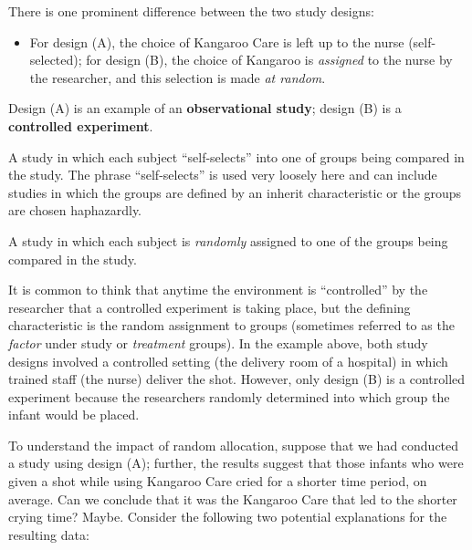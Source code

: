 \documentclass[]{book}
\providecommand{\tightlist}{%
  \setlength{\itemsep}{0pt}\setlength{\parskip}{0pt}}
\theoremstyle{plain}
\theoremstyle{mydefn}
\theoremstyle{myexmpl}
\theoremstyle{remark}
\let\BeginKnitrBlock\begin \let\EndKnitrBlock\end
\let\BeginKnitrBlock\begin \let\EndKnitrBlock\end
\begin{document}
There is one prominent difference between the two study designs:

\begin{itemize}
\tightlist
\item
  For design (A), the choice of Kangaroo Care is left up to the nurse
  (self-selected); for design (B), the choice of Kangaroo is
  \emph{assigned} to the nurse by the researcher, and this selection is
  made \emph{at random}.
\end{itemize}

Design (A) is an example of an \textbf{observational study}; design (B)
is a \textbf{controlled experiment}.

\BeginKnitrBlock{definition}[Observational Study]
\protect\hypertarget{def:defn-observational-study}{}{\label{def:defn-observational-study}
{} }A study in which each subject
``self-selects'' into one of groups being compared in the study. The
phrase ``self-selects'' is used very loosely here and can include
studies in which the groups are defined by an inherit characteristic or
the groups are chosen haphazardly.
\EndKnitrBlock{definition}

\BeginKnitrBlock{definition}[Controlled Experiment]
\protect\hypertarget{def:defn-controlled-experiment}{}{\label{def:defn-controlled-experiment}
{} }A study in which each subject is
\emph{randomly} assigned to one of the groups being compared in the
study.
\EndKnitrBlock{definition}

It is common to think that anytime the environment is ``controlled'' by
the researcher that a controlled experiment is taking place, but the
defining characteristic is the random assignment to groups (sometimes
referred to as the \emph{factor} under study or \emph{treatment}
groups). In the example above, both study designs involved a controlled
setting (the delivery room of a hospital) in which trained staff (the
nurse) deliver the shot. However, only design (B) is a controlled
experiment because the researchers randomly determined into which group
the infant would be placed.

To understand the impact of random allocation, suppose that we had
conducted a study using design (A); further, the results suggest that
those infants who were given a shot while using Kangaroo Care cried for
a shorter time period, on average. Can we conclude that it was the
Kangaroo Care that led to the shorter crying time? Maybe. Consider the
following two potential explanations for the resulting data:
\end{document}

